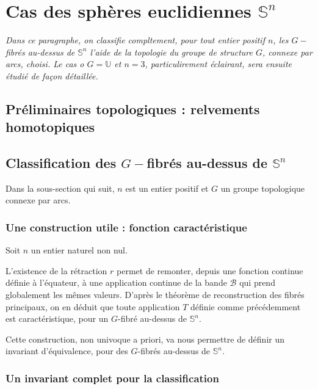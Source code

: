 \chapter{Cas des sph\`eres euclidiennes $\mathbb{S}^n$}

\emph{%
Dans ce paragraphe, on classifie compltement, pour tout entier positif $n$, les $G-$fibr\'es au-dessus de $\mathbb{S}^n$ %
 l'aide de la topologie du groupe de structure $G$, connexe par arcs, choisi. %
Le cas o $G=\mathbb{U}$ et $n=3$, particulirement \'eclairant, sera ensuite \'etudi\'e de fa\c con d\'etaill\'ee.%
}


\section{Pr\'eliminaires topologiques : relvements homotopiques}


\section{Classification des $G-$fibr\'es au-dessus de $\mathbb{S}^n$}

Dans la sous-section qui suit, $n$ est un entier positif et $G$ un groupe topologique connexe par arcs.

\subsection{Une construction utile : fonction caract\'eristique}

Soit $n$ un entier naturel non nul.


\dotfill

L'existence de la rétraction $r$ permet de remonter, depuis une fonction continue définie à l'équateur, %
à une application continue de la bande $\mathcal{B}$ qui prend globalement les mêmes valeurs. %
D'après le théorème de reconstruction des fibrés principaux, %
on en déduit que toute application $T$ définie comme précédemment est caractéristique, pour un $G$-fibré au-dessus de $\mathbb{S}^n$.
\par
Cette construction, non univoque a priori, va nous permettre de définir un invariant d'équivalence, pour des $G$-fibrés au-dessus de $\mathbb{S}^n$.

\subsection{Un invariant complet pour la classification}

